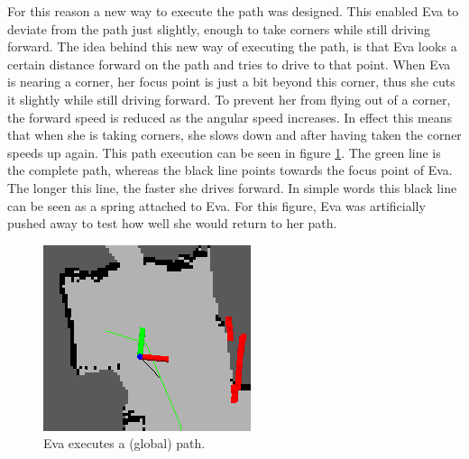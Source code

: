 \documentclass[project_eva.tex]{subfiles}
\begin{document}
For this reason a new way to execute the path was designed. This enabled Eva to deviate from the path just slightly, enough 
to take corners while still driving forward. The idea behind this new way of executing the path, is that Eva looks a 
certain distance forward on the path and tries to drive to that point. When Eva is nearing a corner, her focus point is 
just a bit beyond this corner, thus she cuts it slightly while still driving forward. To prevent her from flying out of a 
corner, the forward speed is reduced as the angular speed increases. In effect this means that when she is taking corners, 
she slows down and after having taken the corner speeds up again. This path execution can be seen in figure 
\ref{fig:global_path}. The green line is the complete path, whereas the black line points towards the focus point of Eva. 
The longer this line, the faster she drives forward. In simple words this black line can be seen as a spring attached to 
Eva. For this figure, Eva was artificially pushed away to test how well she would return to her path.
\begin{figure}[ht!]
	\centering
	\mbox{\includegraphics[scale=0.4]{Images/global_path.png}}
	\caption{Eva executes a (global) path.}
	\label{fig:global_path}
\end{figure}
\end{document}

